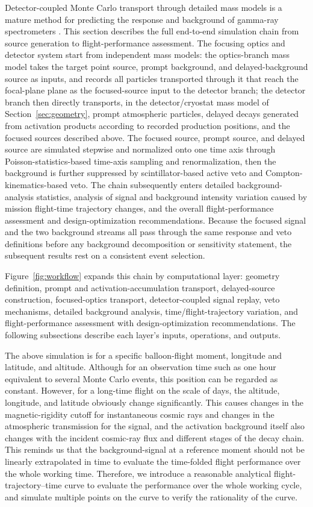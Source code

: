 \documentclass[11pt]{article}
\begin{document}
Detector-coupled Monte Carlo transport through detailed mass models is a mature method for predicting the response and background of gamma-ray spectrometers \cite{Sturner2003}. This section describes the full end-to-end simulation chain from source generation to flight-performance assessment. The focusing optics and detector system start from independent mass models: the optics-branch mass model takes the target point source, prompt background, and delayed-background source as inputs, and records all particles transported through it that reach the focal-plane plane as the focused-source input to the detector branch; the detector branch then directly transports, in the detector/cryostat mass model of Section~\ref{sec:geometry}, prompt atmospheric particles, delayed decays generated from activation products according to recorded production positions, and the focused sources described above. The focused source, prompt source, and delayed source are simulated stepwise and normalized onto one time axis through Poisson-statistics-based time-axis sampling and renormalization, then the background is further suppressed by scintillator-based active veto and Compton-kinematics-based veto. The chain subsequently enters detailed background-analysis statistics, analysis of signal and background intensity variation caused by mission flight-time trajectory changes, and the overall flight-performance assessment and design-optimization recommendations. Because the focused signal and the two background streams all pass through the same response and veto definitions before any background decomposition or sensitivity statement, the subsequent results rest on a consistent event selection.

Figure~\ref{fig:workflow} expands this chain by computational layer: geometry definition, prompt and activation-accumulation transport, delayed-source construction, focused-optics transport, detector-coupled signal replay, veto mechanisms, detailed background analysis, time/flight-trajectory variation, and flight-performance assessment with design-optimization recommendations. The following subsections describe each layer's inputs, operations, and outputs.

The above simulation is for a specific balloon-flight moment, longitude and latitude, and altitude. Although for an observation time such as one hour equivalent to several Monte Carlo events, this position can be regarded as constant. However, for a long-time flight on the scale of days, the altitude, longitude, and latitude obviously change significantly. This causes changes in the magnetic-rigidity cutoff for instantaneous cosmic rays and changes in the atmospheric transmission for the signal, and the activation background itself also changes with the incident cosmic-ray flux and different stages of the decay chain. This reminds us that the background-signal at a reference moment should not be linearly extrapolated in time to evaluate the time-folded flight performance over the whole working time. Therefore, we introduce a reasonable analytical flight-trajectory--time curve to evaluate the performance over the whole working cycle, and simulate multiple points on the curve to verify the rationality of the curve.
\end{document}
